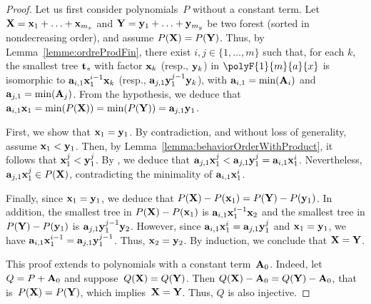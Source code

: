 		
		\begin{proof}
	        Let us first consider polynomials~$P$ without a constant term.
			Let $\forest{X} = \tree{x}_1 + \ldots + \tree{x}_{m_x}$ and $\forest{Y} = \tree{y}_1 + \ldots + \tree{y}_{m_y}$ be two forest (sorted in nondecreasing order), and assume $P(\forest{X}) = P(\forest{Y})$. 
			Thus, by Lemma~\ref{lemme:ordreProdFin}, there exist $i, j \in \{1, \ldots, m\}$ such that, for each $k$, the smallest tree $\tree{t}_s$ with factor $\tree{x}_k$ (resp., $\tree{y}_k$) in $\polyF{1}{m}{a}{x}$ is isomorphic to $\tree{a}_{i,1} \tree{x}_1^{i-1}\tree{x}_k$ (resp., $\tree{a}_{j,1} \tree{y}_1^{j-1}\tree{y}_k$), with $\tree{a}_{i,1} = \min(\forest{A}_i)$ and $\tree{a}_{j,1} = \min(\forest{A}_j)$. 
			From the hypothesis, we deduce that $\tree{a}_{i,1} \tree{x}_1 = \min(P(\forest{x})) =  \min(P(\forest{y})) = \tree{a}_{j,1} \tree{y}_1$. 
			
			First, we show that $\tree{x}_1 = \tree{y}_1$.
			By contradiction, and without loss of generality, assume $\tree{x}_1 < \tree{y}_1$.
			Then, by Lemma~\ref{lemma:behaviorOrderWithProduct}, it follows that $\tree{x}_1^{j} < \tree{y}_1^{j}$.
			By \cite[Lemma 24]{article_arbre}, we deduce that $\tree{a}_{j,1} \tree{x}_1^{j} < \tree{a}_{j,1} \tree{y}_1^j = \tree{a}_{i,1} \tree{x}_1^i$.
			Nevertheless, $\tree{a}_{j,1} \tree{x}_1^{j} \in P(\forest{X})$,
			contradicting the minimality of $\tree{a}_{i,1} \tree{x}_1^i$. 
			
			Finally, since $\tree{x}_1 = \tree{y}_1$, we deduce that $P(\forest{X}) - P(\tree{x}_1) = P(\forest{Y}) - P(\tree{y}_1)$.  
			In addition, the smallest tree in $P(\forest{X}) - P(\tree{x}_1)$ is $\tree{a}_{i,1} \tree{x}_1^{i-1} \tree{x}_2$ and the smallest tree in $P(\forest{y}) - P(\tree{y}_1)$ is $\tree{a}_{j,1} \tree{y}_1^{j-1} \tree{y}_2$.  
			However, since $\tree{a}_{i,1} \tree{x}_1^i = \tree{a}_{j,1} \tree{y}_1^j$ and $\tree{x}_1 = \tree{y}_1$, we have $\tree{a}_{i,1} \tree{x}_1^{i-1} = \tree{a}_{j,1} \tree{y}_1^{j-1}$. 
			Thus, $\tree{x}_2 = \tree{y}_2$. 
			By induction, we conclude that $\forest{X} = \forest{Y}$.
	
	        This proof extends to polynomials with a constant term~$\forest{A}_0$. Indeed, let~$Q = P + \forest{A}_0$ and suppose~$Q(\forest{X}) = Q(\forest{Y})$. Then $Q(\forest{X}) - \forest{A}_0 = Q(\forest{Y}) - \forest{A}_0$, that is~$P(\forest{X}) = P(\forest{Y})$, which implies~$\forest{X} = \forest{Y}$. Thus, $Q$ is also injective.
		\end{proof}
	
